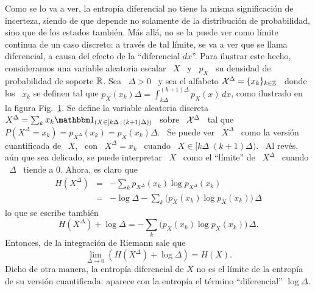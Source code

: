Como se lo va a ver, la entrop\'ia diferencial no tiene la misma significaci\'on
de  incerteza,  siendo de  que  depende no  solamente  de  la distribuci\'on  de
probabilidad, sino que  de los estados tambi\'en.  M\'as all\'a,  no se la puede
ver como l\'imite  continua de un caso discreto: a trav\'es  de tal l\'imite, se
va  a ver  que se  llama diferencial,  a causa  del efecto  de  la ``diferencial
$dx$''.  Para ilustrar este hecho, consideramos una variable aleatoria escalar \
$X$ \ y \ $p_X$ \ su densidad de probabilidad de soporte $\mathbb{R}$.  Sea \ $\Delta
> 0$  \ y sea el alfabeto  $\mathcal{X}^\Delta = \{ x_k  \}_{k \in \mathbb{Z}}$ \  donde los \
$x_k$ se definen tal que $\displaystyle p_X(x_k) \Delta = \int_{k \Delta}^{(k+1)
  \Delta}     p_X(x)    \,     dx$,    como     ilustrado    en     la    figura
Fig.~\ref{Fig:SZ:CuantificacionX}.  Se  define la variable  aleatoria discreta \
$X^\Delta =  \sum_k x_k \un_{(X  \in [k  \Delta \; (k+1)  \Delta ))}$ \  sobre \
$\mathcal{X}^\Delta$  \ tal  que  \ $P(X^\Delta  =  x_k) =  p_{X^\Delta}(x_k) =  p_X(x_k)
\Delta$.  \ Se puede ver \ $X^\Delta$ \ como la versi\'on cuantificada de \ $X$,
\ con \ $X^\Delta =  x_k$ \ cuando \ $X \in [k \Delta \;  (k+1) \Delta )$.  \ Al
rev\'es,  a\'un  que  sea  delicado,  se  puede interpretar  \  $X$  \  como  el
``l\'imite'' de \ $X^\Delta$  \ cuando \ $\Delta$ \ tiende a  0. Ahora, es claro
que
%
\begin{eqnarray*}
H(X^\Delta) & = & - \sum_k p_{X^\Delta}(x_k) \log p_{X^\Delta}(x_k)\\[2.5mm]
%
& = & - \log \Delta - \sum_k \Big( p_X(x_k) \log p_X(x_k) \Big) \, \Delta
\end{eqnarray*}
%
lo que se escribe tambi\'en
%
\[
H(X^\Delta)  + \log  \Delta =  - \sum_k  \Big( p_X(x_k)  \log p_X(x_k)  \Big) \,
\Delta.
\]
%
Entonces, de la integraci\'on de Riemann sale que
%
\[
\lim_{\Delta \to 0} \left( H(X^\Delta) + \log \Delta \right) = H(X).
\]
%
Dicho de otra manera,  la entrop\'ia diferencial de $X$ no es  el l\'imite de la
entrop\'ia de su versi\'on cuantificada:  aparece con la entrop\'ia el t\'ermino
``diferencial'' $\log \Delta$.
%
\begin{figure}[h!]
%
\begin{center}  \end{center}
%
%
\label{Fig:SZ:CuantificacionX}
\end{figure}

